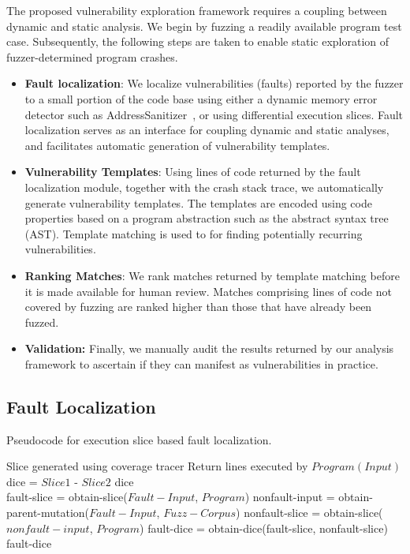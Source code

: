 The proposed vulnerability exploration framework requires a coupling between dynamic and static analysis.
We begin by fuzzing a readily available program test case.
Subsequently, the following steps are taken to enable static exploration of fuzzer-determined program crashes.
\begin{itemize}
\item {\bf Fault localization}: We localize vulnerabilities (faults) reported by the fuzzer to a small portion of the code base using either a dynamic memory error detector such as AddressSanitizer~\cite{asanfull}, or using differential execution slices.
Fault localization serves as an interface for coupling dynamic and static analyses, and facilitates automatic generation of vulnerability templates.
\item {\bf Vulnerability Templates}: Using lines of code returned by the fault localization module, together with the crash stack trace, we automatically generate vulnerability templates.
The templates are encoded using code properties based on a program abstraction such as the abstract syntax tree (AST).
Template matching is used to for finding potentially recurring vulnerabilities.
\item {\bf Ranking Matches}: We rank matches returned by template matching before it is made available for human review.
Matches comprising lines of code not covered by fuzzing are ranked higher than those that have already been fuzzed.
\item {\bf Validation:} Finally, we manually audit the results returned by our analysis framework to ascertain if they can manifest as vulnerabilities in practice.
\end{itemize}

\subsection{Fault Localization}
\label{sec:code_suspects}


\begin{algorithm}[!t]
\caption{Pseudocode for execution slice based fault localization.}
\label{alg:slice_local}

\begin{algorithmic}[1]
\LineComment Slice generated using coverage tracer
\State Return lines executed by $Program(Input)$
\EndFunction
\\
\State dice = $Slice1$ - $Slice2$
\State \Return dice
\EndFunction
\\
\State fault-slice = obtain-slice($Fault-Input$, $Program$)
\State nonfault-input = obtain-parent-mutation($Fault-Input$, $Fuzz-Corpus$)
\State nonfault-slice = obtain-slice($nonfault-input$, $Program$)
\State fault-dice = obtain-dice(fault-slice, nonfault-slice)
\State \Return fault-dice
\EndFunction
\end{algorithmic}
\end{algorithm}


